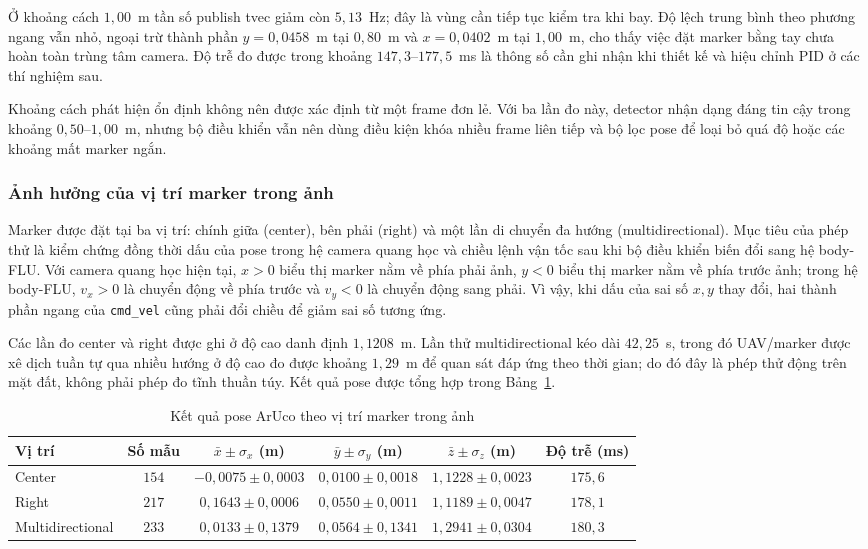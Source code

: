 Ở khoảng cách $1{,}00$~m tần số publish tvec giảm còn $5{,}13$~Hz; đây là vùng cần tiếp tục kiểm tra khi bay. Độ lệch trung bình theo phương ngang vẫn nhỏ, ngoại trừ thành phần $y=0{,}0458$~m tại $0{,}80$~m và $x=0{,}0402$~m tại $1{,}00$~m, cho thấy việc đặt marker bằng tay chưa hoàn toàn trùng tâm camera. Độ trễ đo được trong khoảng $147{,}3$--$177{,}5$~ms là thông số cần ghi nhận khi thiết kế và hiệu chỉnh PID ở các thí nghiệm sau.

Khoảng cách phát hiện ổn định không nên được xác định từ một frame đơn lẻ. Với ba lần đo này, detector nhận dạng đáng tin cậy trong khoảng $0{,}50$--$1{,}00$~m, nhưng bộ điều khiển vẫn nên dùng điều kiện khóa nhiều frame liên tiếp và bộ lọc pose để loại bỏ quá độ hoặc các khoảng mất marker ngắn.

\subsubsection{Ảnh hưởng của vị trí marker trong ảnh}

Marker được đặt tại ba vị trí: chính giữa (center), bên phải (right) và một lần di chuyển đa hướng (multidirectional). Mục tiêu của phép thử là kiểm chứng đồng thời dấu của pose trong hệ camera quang học và chiều lệnh vận tốc sau khi bộ điều khiển biến đổi sang hệ body-FLU. Với camera quang học hiện tại, $x>0$ biểu thị marker nằm về phía phải ảnh, $y<0$ biểu thị marker nằm về phía trước ảnh; trong hệ body-FLU, $v_x>0$ là chuyển động về phía trước và $v_y<0$ là chuyển động sang phải. Vì vậy, khi dấu của sai số $x,y$ thay đổi, hai thành phần ngang của \texttt{cmd\_vel} cũng phải đổi chiều để giảm sai số tương ứng.

Các lần đo center và right được ghi ở độ cao danh định $1{,}1208$~m. Lần thử multidirectional kéo dài $42{,}25$~s, trong đó UAV/marker được xê dịch tuần tự qua nhiều hướng ở độ cao đo được khoảng $1{,}29$~m để quan sát đáp ứng theo thời gian; do đó đây là phép thử động trên mặt đất, không phải phép đo tĩnh thuần túy. Kết quả pose được tổng hợp trong Bảng~\ref{tab:marker_position_pose_result}.

\begin{table}[H]
    \centering
    \small
    \caption{Kết quả pose ArUco theo vị trí marker trong ảnh}
    \label{tab:marker_position_pose_result}
    \setlength{\tabcolsep}{4pt}
    \begin{tabular}{l c c c c c}
        \toprule
        \textbf{Vị trí} & \textbf{Số mẫu} & \textbf{$\bar{x}\pm\sigma_x$ (m)} & \textbf{$\bar{y}\pm\sigma_y$ (m)} & \textbf{$\bar{z}\pm\sigma_z$ (m)} & \textbf{Độ trễ (ms)} \\
        \midrule
        Center & $154$ & $-0{,}0075\pm0{,}0003$ & $0{,}0100\pm0{,}0018$ & $1{,}1228\pm0{,}0023$ & $175{,}6$ \\
        Right & $217$ & $0{,}1643\pm0{,}0006$ & $0{,}0550\pm0{,}0011$ & $1{,}1189\pm0{,}0047$ & $178{,}1$ \\
        Multidirectional & $233$ & $0{,}0133\pm0{,}1379$ & $0{,}0564\pm0{,}1341$ & $1{,}2941\pm0{,}0304$ & $180{,}3$ \\
        \bottomrule
    \end{tabular}
\end{table}

